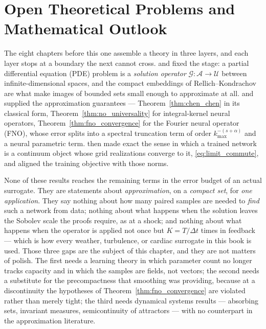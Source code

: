 
\chapter{Open Theoretical Problems and Mathematical Outlook}
\label{ch:part1-open-theoretical-problems-and-mathematical}
\label{sec:conclusion}

The eight chapters before this one assemble a theory in three layers, and
each layer stops at a boundary the next cannot cross. 
and  fixed the
stage: a partial differential equation (PDE) problem is a \emph{solution
operator} $\mathcal{G}:\mathcal{A}\to\mathcal{U}$ between infinite-dimensional
spaces, and the compact embeddings of Rellich--Kondrachov are what make images
of bounded sets small enough to
approximate at all.
 and
 supplied the
approximation guarantees --- Theorem~\ref{thm:chen_chen} in its classical form,
Theorem~\ref{thm:no_universality} for integral-kernel neural operators,
Theorem~\ref{thm:fno_convergence} for the Fourier neural operator (FNO),
whose error splits into a spectral truncation term of order $k_{\max}^{-(s+\alpha)}$
and a neural parametric term. 
then made exact the sense in which a trained network is a continuum object whose
grid realizations converge to it, \eqref{eq:limit_commute}, and
 aligned the
training objective with those norms.

None of these results reaches the remaining terms in the error budget of an
actual surrogate. They are statements about \emph{approximation}, on a
\emph{compact set}, for \emph{one application}. They say nothing about how many
paired samples are needed to \emph{find} such a network from data; nothing about
what happens when the solution leaves the Sobolev scale the proofs require, as
at a shock; and nothing about what happens when the operator is applied not once
but $K = T/\Delta t$ times in feedback --- which is how every weather,
turbulence, or cardiac surrogate in this book is used. Those three
gaps are the subject of this chapter, and they are not
matters of polish. The
first needs a learning theory in which parameter count no longer
tracks capacity and in which the samples are fields, not vectors; the
second needs a substitute for the precompactness that smoothing was providing,
because at a discontinuity the hypotheses of Theorem~\ref{thm:fno_convergence}
are violated rather than merely tight; the third needs dynamical systems results
--- absorbing sets, invariant measures, semicontinuity of attractors --- with no
counterpart in the approximation literature.

